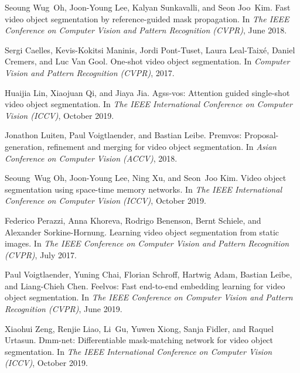 \documentclass{article}
\begin{document}
{
\clearpage

\begin{thebibliography}{10}

Seoung Wug~Oh, Joon-Young Lee, Kalyan Sunkavalli, and Seon Joo~Kim.
\newblock Fast video object segmentation by reference-guided mask propagation.
\newblock In {\em The IEEE Conference on Computer Vision and Pattern
  Recognition (CVPR)}, June 2018.

Sergi Caelles, Kevis-Kokitsi Maninis, Jordi Pont-Tuset, Laura Leal-Taix\'e,
  Daniel Cremers, and Luc {Van Gool}.
\newblock One-shot video object segmentation.
\newblock In {\em Computer Vision and Pattern Recognition (CVPR)}, 2017.

Huaijia Lin, Xiaojuan Qi, and Jiaya Jia.
\newblock Agss-vos: Attention guided single-shot video object segmentation.
\newblock In {\em The IEEE International Conference on Computer Vision (ICCV)},
  October 2019.

Jonathon Luiten, Paul Voigtlaender, and Bastian Leibe.
\newblock Premvos: Proposal-generation, refinement and merging for video object
  segmentation.
\newblock In {\em Asian Conference on Computer Vision (ACCV)}, 2018.

Seoung~Wug Oh, Joon-Young Lee, Ning Xu, and Seon~Joo Kim.
\newblock Video object segmentation using space-time memory networks.
\newblock In {\em The IEEE International Conference on Computer Vision (ICCV)},
  October 2019.

Federico Perazzi, Anna Khoreva, Rodrigo Benenson, Bernt Schiele, and Alexander
  Sorkine-Hornung.
\newblock Learning video object segmentation from static images.
\newblock In {\em The IEEE Conference on Computer Vision and Pattern
  Recognition (CVPR)}, July 2017.

Paul Voigtlaender, Yuning Chai, Florian Schroff, Hartwig Adam, Bastian Leibe,
  and Liang-Chieh Chen.
\newblock Feelvos: Fast end-to-end embedding learning for video object
  segmentation.
\newblock In {\em The IEEE Conference on Computer Vision and Pattern
  Recognition (CVPR)}, June 2019.

Xiaohui Zeng, Renjie Liao, Li~Gu, Yuwen Xiong, Sanja Fidler, and Raquel
  Urtasun.
\newblock Dmm-net: Differentiable mask-matching network for video object
  segmentation.
\newblock In {\em The IEEE International Conference on Computer Vision (ICCV)},
  October 2019.


\end{thebibliography}}
\end{document}

